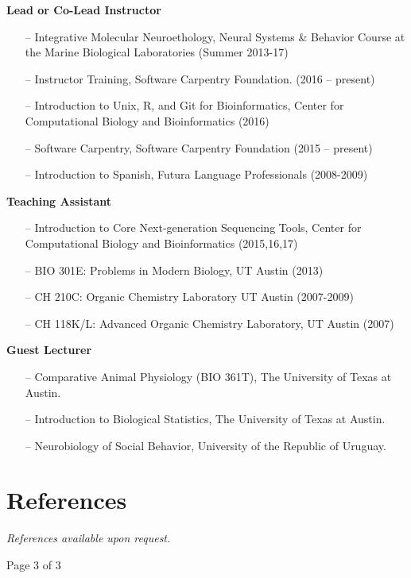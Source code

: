 \documentclass[margin,line]{resume}
\begin{document}
\begin{resume}
\begin{itemize}
\end{itemize}

{\bf Lead or Co-Lead Instructor }
\begin{itemize}
\raggedright
\item[--] Integrative Molecular Neuroethology, Neural Systems \& Behavior Course at the Marine Biological Laboratories (Summer 2013-17)
\item[--] Instructor Training, Software Carpentry Foundation. (2016 – present)
\item[--] Introduction to Unix, R, and Git for Bioinformatics, Center for Computational Biology and Bioinformatics (2016)
\item[--] Software Carpentry, Software Carpentry Foundation (2015 – present)
\item[--] Introduction to Spanish, Futura Language Professionals (2008-2009)
\end{itemize}

{\bf Teaching Assistant}
\begin{itemize}

\item[--] Introduction to Core Next-generation Sequencing Tools, Center for Computational Biology and Bioinformatics (2015,16,17)
\item[--] BIO 301E: Problems in Modern Biology, UT Austin (2013)
\item[--] CH 210C: Organic Chemistry Laboratory UT Austin (2007-2009)
\item[--] CH 118K/L: Advanced Organic Chemistry Laboratory, UT Austin (2007)
\end{itemize}

{\bf Guest Lecturer}

\begin{itemize}

\item[--] Comparative Animal Physiology (BIO 361T), The University of Texas at Austin. 
\item[--] Introduction to Biological Statistics, The University of Texas at Austin.  
\item[--] Neurobiology of Social Behavior, University of the Republic of Uruguay. 
\end{itemize}

\section{\mysidestyle References}

{\em References available upon request.}


\vspace{0.3 cm}
{\centerline {Page 3 of 3}}

\end{resume}
\end{document}
